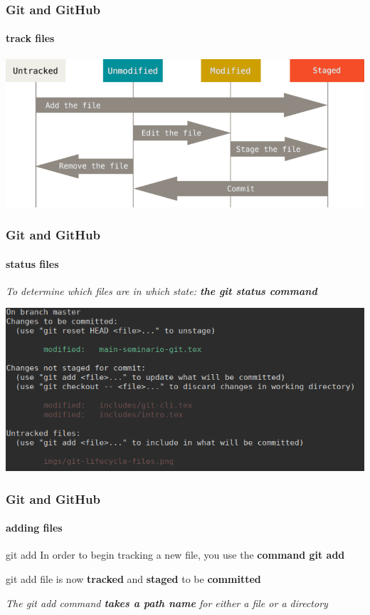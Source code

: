 \begin{frame}
	\frametitle{Git and GitHub}
    \framesubtitle{track files}
    \addtocounter{nframe}{1}

	\begin{center}
		\includegraphics[width=.95\textwidth]{imgs/git-lifecycle-files.png}
	\end{center}

\end{frame}

\begin{frame}
	\frametitle{Git and GitHub}
    \framesubtitle{status files}
    \addtocounter{nframe}{1}

	\textit{To determine which files are in which state: \textbf{the git status command}}

	\begin{center}
		\includegraphics[width=.95\textwidth]{imgs/git-status.png}
	\end{center}

\end{frame}

\begin{frame}
	\frametitle{Git and GitHub}
    \framesubtitle{adding files}
    \addtocounter{nframe}{1}


	\begin{block}{git add}
		In order to begin tracking a new file, you use the \textbf{command git add}
	\end{block}

	\begin{block}{git add}
		file is now \textbf{tracked} and \textbf{staged} to be \textbf{committed}
	\end{block}

	\textit{The git add command \textbf{takes a path name} for either a file or a directory}
	

\end{frame}

